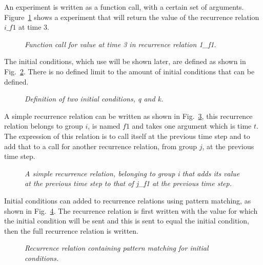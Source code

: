 \documentclass{article}
\begin{document}
%	

An experiment is written as a function call, with a certain set of arguments. Figure~\ref{fig:2exofla} shows a experiment that will return the value of the recurrence relation $i\_f1$ at time $3$.
\begin{figure}[H]
	\centering
	
	\caption{\it Function call for value at time 3 in recurrence relation 1\_f1.}
	\label{fig:2exofla}
\end{figure} 
 
The initial conditions, which use will be shown later, are defined as shown in Fig.~\ref{fig:3exofla}. There is no defined  limit to the amount of initial conditions that can be defined. 
\begin{figure}[H]
	\centering
	
	\caption{\it Definition of two initial conditions, q and k.}
	\label{fig:3exofla}
\end{figure} 
 
A simple recurrence relation can be written as shown in Fig.~\ref{fig:4exofla}, this recurrence relation belongs to group $i$, is named $f1$ and takes one argument which is time $t$. The expression of this relation is to call itself at the previous time step and to add that to a call for another recurrence relation, from group $j$, at the previous time step. 
\begin{figure}[H]
	\centering
	
	\caption{\it A simple recurrence relation, belonging to group i that adds its value at the previous time step to that of j\_f1 at the previous time step.}
	\label{fig:4exofla}
\end{figure} 
 
Initial conditions can added to recurrence relations using pattern matching, as shown in Fig.~\ref{fig:5exofla}. The recurrence relation is first written with the value for which the initial condition will be sent and this is sent to equal the initial condition, then the full recurrence relation is written.  
\begin{figure}[H]
	\centering
	
	\caption{\it Recurrence relation containing pattern matching for initial conditions.}
	\label{fig:5exofla}
\end{figure} 
 
\end{document}
